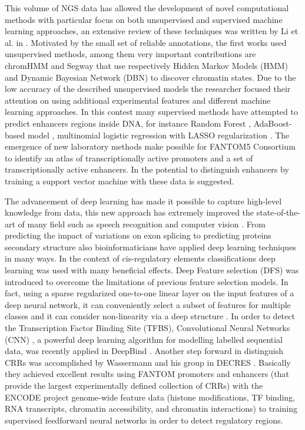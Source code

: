 This volume of NGS data has allowed the development of novel computational
methods with particular focus on both unsupervised and supervised machine
learning approaches, an extensive review of these techniques was written by Li et al. in \cite{LiMLReview}. Motivated by the small set of reliable annotations, the first works used unsupervised methods, among them very important contributions are chromHMM \cite{ernst2012chromhmm}
and Segway \cite{HoffmanSegway} that use respectively Hidden Markov Models
(HMM) and Dynamic Bayesian Network (DBN) to discover chromatin states. Due
to the low accuracy of the described unsupervised models the researcher focused their attention on using additional experimental features and
different machine learning approaches. In this contest many supervised
methods have attempted to predict enhancers regions inside DNA, for
instance Random Forest \cite{RFECS}, AdaBoost-based model
\cite{DELTA_adaboost}, multinomial logistic regression with LASSO
regularization \cite{ChenMultinomialLASSORegression}. The emergence of new
laboratory methods make possible for FANTOM5 Consortium to identify an
atlas of transcriptionally active promoters and a set of transcriptionally
active enhancers. In \cite{DEEP} the potential to distinguish enhancers by
training a support vector machine with these data is suggested.

The advancement of deep learning has made it possible to capture
high-level knowledge from data, this new approach has extremely improved
the state-of-the-art of many field such as speech recognition and computer
vision \cite{lecun2015deeplearning}. From predicting the impact of
variations on exon splicing \cite{XiongExon} to predicting proteins
secondary structure \cite{SecondaryStructure} also bioinformaticians have
applied deep learning techniques in many ways. In the context of
cis-regulatory elements classifications deep learning was used with many
beneficial effects. Deep Feature selection (DFS) was introduced to
overcome the limitations of previous feature selection models. In fact,
using a sparse regularized one-to-one linear layer on the input features
of a deep neural network, it can conveniently select a subset of features
for multiple classes and it can consider non-linearity via a deep
structure \cite{LiYifengDFS}. In order to detect the Transcription Factor
Binding Site (TFBS), Convolutional Neural Networks (CNN) \cite{LecunCNN,
MartinezCNN}, a powerful deep learning algorithm for modelling labelled
sequential data, was recently applied in DeepBind \cite{AlipanahiDeepBind}.
Another step forward in distinguish CRRs was accomplished by Wassermann
and his group in DECRES \cite{WassermannDECRES}. Basically they achieved
excellent results using FANTOM promoters and enhancers (that provide the
largest experimentally defined collection of CRRs) with the ENCODE project
genome-wide feature data (histone modifications, TF binding, RNA
transcripts, chromatin accessibility, and chromatin interactions) to
training supervised feedforward neural networks in order to detect
regulatory regions.

